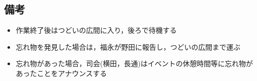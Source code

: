 \subsection{備考}
\begin{itemize}
  \item 作業終了後はつどいの広間に入り，後ろで待機する
  \item 忘れ物を発見した場合は，福永が野田に報告し，つどいの広間まで運ぶ
  \item 忘れ物があった場合，司会(横田，長通)はイベントの休憩時間等に忘れ物があったことをアナウンスする
\end{itemize}

%


